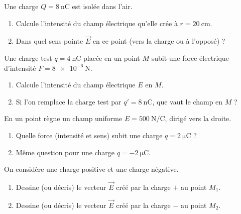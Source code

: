 \documentclass[11pt,a4paper]{article}
\newcommand{\vv}[1]{\vec{#1}}\newcommand{\ds}{\displaystyle}
\begin{document}

\begin{exo}
Une charge $Q = \SI{+8}{\nano\coulomb}$ est isolée dans l'air.
\begin{enumerate}[label=\alph*)]
  \item Calcule l'intensité du champ électrique qu'elle crée à $r = \SI{20}{\centi\metre}$.
  \item Dans quel sens pointe $\vv{E}$ en ce point (vers la charge ou à l'opposé) ?
\end{enumerate}
\end{exo}

\begin{exo}
Une charge test $q = \SI{+4}{\nano\coulomb}$ placée en un point $M$ subit une force électrique
d'intensité $F = \SI{8e-6}{\newton}$.
\begin{enumerate}[label=\alph*)]
  \item Calcule l'intensité du champ électrique $E$ en $M$.
  \item Si l'on remplace la charge test par $q' = \SI{+8}{\nano\coulomb}$, que vaut le champ en $M$ ?
\end{enumerate}
\end{exo}

\begin{exo}
En un point règne un champ uniforme $E = \SI{500}{\newton\per\coulomb}$, dirigé vers la droite.
\begin{enumerate}[label=\alph*)]
  \item Quelle force (intensité et sens) subit une charge $q = \SI{+2}{\micro\coulomb}$ ?
  \item Même question pour une charge $q = \SI{-2}{\micro\coulomb}$.
\end{enumerate}
\end{exo}

\begin{exo}
On considère une charge positive et une charge négative.
\begin{center}
\end{center}
\begin{enumerate}[label=\alph*)]
  \item Dessine (ou décris) le vecteur $\vv{E}$ créé par la charge $+$ au point $M_1$.
  \item Dessine (ou décris) le vecteur $\vv{E}$ créé par la charge $-$ au point $M_2$.
\end{enumerate}
\end{exo}
\end{document}
